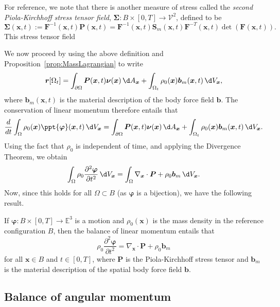 \documentclass[
  letterpaper,
  DIV=11,
  numbers=noendperiod]{scrreprt}
\theoremstyle{plain}
\theoremstyle{remark}
\begin{document}
For reference, we note that there is another measure of stress called
the \emph{second Piola-Kirchhoff stress tensor field},
\({\boldsymbol{\Sigma}}:B\times[0,T]\to{\mathcal{V}}^2\), defined to be
\[{\boldsymbol{\Sigma}}({\boldsymbol{x}},t) := {\boldsymbol{F}}^{-1}({\boldsymbol{x}},t){\boldsymbol{P}}({\boldsymbol{x}},t) = {\boldsymbol{F}}^{-1}({\boldsymbol{x}},t){\boldsymbol{S}}_m({\boldsymbol{x}},t){\boldsymbol{F}}^{-T}({\boldsymbol{x}},t)\det({\boldsymbol{F}}({\boldsymbol{x}},t)).\]
This stress tensor field

We now proceed by using the above definition and
Proposition~\hyperref[prop:MassLagrangian]{{[}prop:MassLagrangian{]}} to
write \[{\boldsymbol{r}}[\Omega_t]
  = \int_{\partial \Omega} {\boldsymbol{P}}({\boldsymbol{x}},t){\boldsymbol{\nu}}({\boldsymbol{x}}){\,\d A_{{\boldsymbol{x}}}}+\int_{\Omega_t}\rho_0({\boldsymbol{x}}){\boldsymbol{b}}_m({\boldsymbol{x}},t){\,\d V_{{\boldsymbol{x}}}},\]
where \({\boldsymbol{b}}_m({\boldsymbol{x}},t)\) is the material
description of the body force field \({\boldsymbol{b}}\). The
conservation of linear momentum therefore entails that
\[\frac{d}{dt}\int_\Omega \rho_0({\boldsymbol{x}})\ppt{{\boldsymbol{\varphi}}}({\boldsymbol{x}},t){\,\d V_{{\boldsymbol{x}}}}
  = \int_{\partial \Omega} {\boldsymbol{P}}({\boldsymbol{x}},t){\boldsymbol{\nu}}({\boldsymbol{x}}){\,\d A_{{\boldsymbol{x}}}}+\int_{\Omega_t}\rho_0({\boldsymbol{x}}){\boldsymbol{b}}_m({\boldsymbol{x}},t){\,\d V_{{\boldsymbol{x}}}}.\]
Using the fact that \(\rho_0\) is independent of time, and applying the
Divergence Theorem, we obtain
\[\int_\Omega \rho_0\frac{\partial^2{\boldsymbol{\varphi}}}{\partial t^2}{\,\d V_{{\boldsymbol{x}}}}
  = \int_\Omega \nabla_{\boldsymbol{x}}\cdot {\boldsymbol{P}}+\rho_0{\boldsymbol{b}}_m{\,\d V_{{\boldsymbol{x}}}}.\]
Now, since this holds for all \(\Omega\subset B\) (as
\({\boldsymbol{\varphi}}\) is a bijection), we have the following
result.

If \({\boldsymbol{\varphi}}:B\times[0,T]\to{\mathbb{E}}^3\) is a motion
and \(\rho_0({\boldsymbol{x}})\) is the mass density in the reference
configuration \(B\), then the balance of linear momentum entails that
\[\rho_0\frac{\partial^2{\boldsymbol{\varphi}}}{\partial t^2} = \nabla_{\boldsymbol{x}}\cdot{\boldsymbol{P}}+\rho_0{\boldsymbol{b}}_m\]
for all \({\boldsymbol{x}}\in B\) and \(t\in[0,T]\), where
\({\boldsymbol{P}}\) is the Piola-Kirchhoff stress tensor and
\({\boldsymbol{b}}_m\) is the material description of the spatial body
force field \({\boldsymbol{b}}\).

\subsection{Balance of angular
momentum}\label{balance-of-angular-momentum-1}
\end{document}
